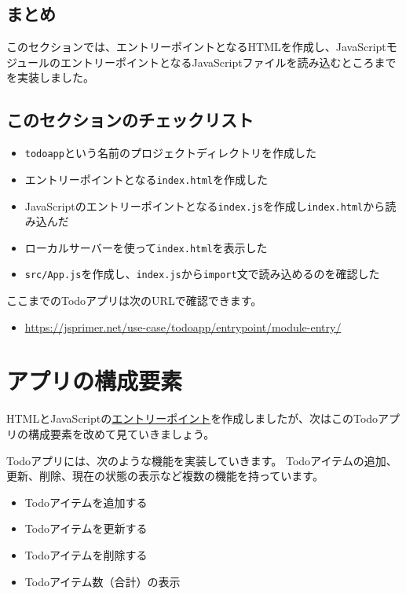 \hypertarget{conclusion}{%
\subsection{まとめ}\label{conclusion}}

このセクションでは、エントリーポイントとなるHTMLを作成し、JavaScriptモジュールのエントリーポイントとなるJavaScriptファイルを読み込むところまでを実装しました。

\hypertarget{section-checklist}{%
\subsection{このセクションのチェックリスト}\label{section-checklist}}

\begin{itemize}
\item
  \texttt{todoapp}という名前のプロジェクトディレクトリを作成した
\item
  エントリーポイントとなる\texttt{index.html}を作成した
\item
  JavaScriptのエントリーポイントとなる\texttt{index.js}を作成し\texttt{index.html}から読み込んだ
\item
  ローカルサーバーを使って\texttt{index.html}を表示した
\item
  \texttt{src/App.js}を作成し、\texttt{index.js}から\texttt{import}文で読み込めるのを確認した
\end{itemize}

ここまでのTodoアプリは次のURLで確認できます。

\begin{itemize}
\item
  \url{https://jsprimer.net/use-case/todoapp/entrypoint/module-entry/}
\end{itemize}

\hypertarget{app-structure}{%
\section{アプリの構成要素}\label{app-structure}}

HTMLとJavaScriptの\href{../entrypoint/README.md}{エントリーポイント}を作成しましたが、次はこのTodoアプリの構成要素を改めて見ていきましょう。

Todoアプリには、次のような機能を実装していきます。
Todoアイテムの追加、更新、削除、現在の状態の表示など複数の機能を持っています。

\begin{itemize}
\item
  Todoアイテムを追加する
\item
  Todoアイテムを更新する
\item
  Todoアイテムを削除する
\item
  Todoアイテム数（合計）の表示
\end{itemize}

